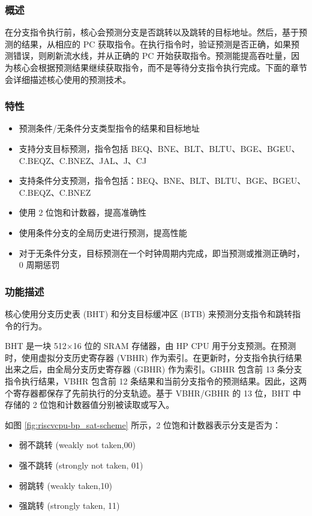 \documentclass[main\_\_CN.tex]{subfiles}
\begin{document}
\subsubsection{概述}
\label{sec:riscvcpu-perf-bp-overview}
在分支指令执行前，核心会预测分支是否跳转以及跳转的目标地址。然后，基于预测的结果，从相应的 PC 获取指令。在执行指令时，验证预测是否正确，如果预测错误，则刷新流水线，并从正确的 PC 开始获取指令。预测能提高吞吐量，因为核心会根据预测结果继续获取指令，而不是等待分支指令执行完成。下面的章节会详细描述核心使用的预测技术。

\subsubsection{特性}
\label{sec:riscvcpu-perf-bp-features}
\begin{itemize}
    \item 预测条件/无条件分支类型指令的结果和目标地址
    \item 支持分支目标预测，指令包括 BEQ、BNE、BLT、BLTU、BGE、BGEU、C.BEQZ、C.BNEZ、JAL、J、CJ
    \item 支持条件分支预测，指令包括：BEQ、BNE、BLT、BLTU、BGE、BGEU、C.BEQZ、C.BNEZ
    \item 使用 2 位饱和计数器，提高准确性
    \item 使用条件分支的全局历史进行预测，提高性能
    \item 对于无条件分支，目标预测在一个时钟周期内完成，即当预测或推测正确时，0 周期惩罚
\end{itemize}

\subsubsection{功能描述}
\label{sec:riscvcpu-perf-bp-func-descr}

核心使用分支历史表 (BHT) 和分支目标缓冲区 (BTB) 来预测分支指令和跳转指令的行为。

BHT 是一块 512×16 位的 SRAM 存储器，由 HP CPU 用于分支预测。在预测时，使用虚拟分支历史寄存器 (VBHR) 作为索引。在更新时，分支指令执行结果出来之后，由全局分支历史寄存器 (GBHR) 作为索引。GBHR 包含前 13 条分支指令执行结果，VBHR 包含前 12 条结果和当前分支指令的预测结果。因此，这两个寄存器都保存了先前执行的分支轨迹。基于 VBHR/GBHR 的 13 位，BHT 中存储的 2 位饱和计数器值分别被读取或写入。

如图 \ref{fig:riscvcpu-bp_sat-scheme} 所示，2 位饱和计数器表示分支是否为：
\begin{itemize}
    \item 弱不跳转 (weakly not taken,00)
    \item 强不跳转 (strongly not taken, 01)
    \item 弱跳转 (weakly taken,10)
    \item 强跳转 (strongly taken, 11)
\end{itemize}
\end{document}
